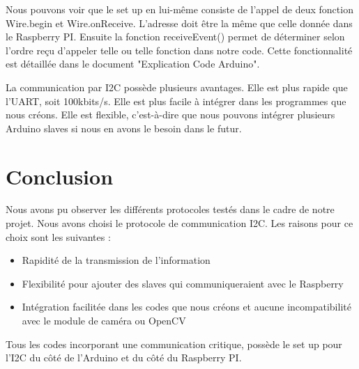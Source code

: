 \documentclass[
	a4paper,									%
	11pt,										%
	twoside,									%
	openright,									%
	notitlepage,									%
	parskip=half,								%
]{scrreprt}										%
\begin{document}
Nous pouvons voir que le set up en lui-même consiste de l'appel de deux fonction Wire.begin et Wire.onReceive. L'adresse
doit être la même que celle donnée dans le Raspberry PI. Ensuite la fonction receiveEvent() permet de déterminer selon
l'ordre reçu d'appeler telle ou telle fonction dans notre code. Cette fonctionnalité est détaillée dans le document "Explication Code Arduino". \par

La communication par I2C possède plusieurs avantages. Elle est plus rapide que l'UART, soit 100kbits/s. Elle est plus facile à intégrer dans les
programmes que nous créons. Elle est flexible, c'est-à-dire que nous pouvons intégrer plusieurs Arduino slaves si 
nous en avons le besoin dans le futur. \par

\chapter{Conclusion}

Nous avons pu observer les différents protocoles testés dans le cadre de notre projet. Nous avons choisi le protocole 
de communication I2C. Les raisons pour ce choix sont les suivantes : 

\begin{itemize}
	\item Rapidité de la transmission de l'information
 	\item Flexibilité pour ajouter des slaves qui communiqueraient avec le Raspberry
  	\item Intégration facilitée dans les codes que nous créons et aucune incompatibilité avec le module de caméra ou OpenCV
\end{itemize}

Tous les codes incorporant une communication critique, possède le set up pour l'I2C du côté de l'Arduino et du côté du
Raspberry PI. 
\end{document}
